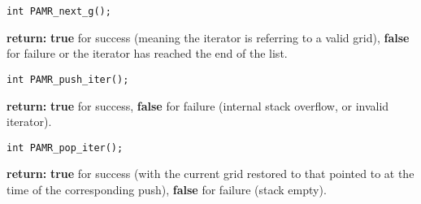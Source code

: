 \documentclass[aps,amssymb,unsortedaddress,nofootinbib]{revtex4}
\def\lsep{\itemsep 0.05in}
\begin{document}

\begin{verbatim}
int PAMR_next_g();
\end{verbatim}
\begin{list}{}{\lsep}
\item {\bf return:} {\bf true} for success (meaning the iterator is referring to a valid grid),
                    {\bf false} for failure or the iterator has reached the end of the list.
\end{list}


\begin{verbatim}
int PAMR_push_iter();
\end{verbatim}
\begin{list}{}{\lsep}
\item {\bf return:} {\bf true} for success, {\bf false} for failure (internal stack
                    overflow, or invalid iterator).
\end{list}


\begin{verbatim}
int PAMR_pop_iter();
\end{verbatim}
\begin{list}{}{\lsep}
\item {\bf return:} {\bf true} for success (with the current grid restored to that
                    pointed to at the time of the corresponding push), {\bf false} for 
                    failure (stack empty).
\end{list}

\end{document}
